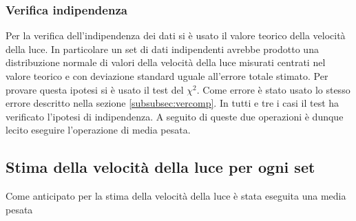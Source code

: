 \documentclass[a4paper,11pt]{article}
\begin{document}
	\subsubsection{Verifica indipendenza}
	Per la verifica dell'indipendenza dei dati si è usato il valore teorico della velocità della luce. In particolare un set di dati indipendenti avrebbe prodotto una distribuzione normale di valori della velocità della luce misurati centrati nel valore teorico e con deviazione standard uguale all'errore totale stimato. Per provare questa ipotesi si è usato il test del $ \chi^2 $. Come errore è stato usato lo stesso errore descritto nella sezione \ref{subsubsec:vercomp}. In tutti e tre i casi il test ha verificato l'ipotesi di indipendenza. A seguito di queste due operazioni è dunque lecito eseguire l'operazione di media pesata.
	\subsection{Stima della velocità della luce per ogni set}
	Come anticipato per la stima della velocità della luce è stata eseguita una media pesata 
	
	
	
\end{document}
